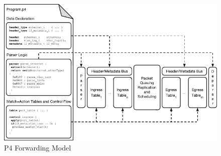 \begin{figure}[htb]
    \caption{P4 Forwarding Model}
    \begin{center}
        \includegraphics[width=1.0\textwidth]{images/p4model.pdf}
    \end{center}
    \label{fig:p4_model}
\end{figure}

